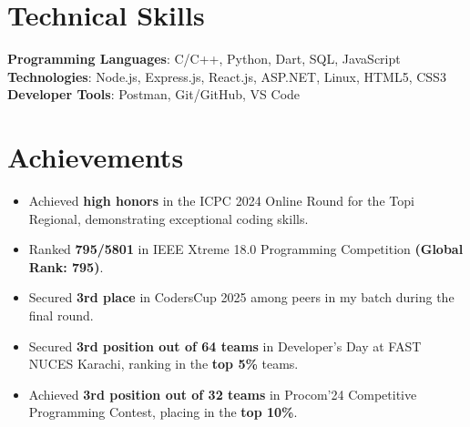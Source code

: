 \documentclass[letterpaper,11pt]{article}
\makeatletter
\newcommand{\resumeItem}[1]{
  \item\small{
    {#1 \vspace{-2pt}}
  }
}
\newcommand{\resumeProjectHeading}[2]{
    \item
    \begin{tabular*}{1.001\textwidth}{l@{\extracolsep{\fill}}r}
      \small#1 & \textbf{\small #2}\\
    \end{tabular*}\vspace{-7pt}
}
\newcommand{\sectionspace}{\vspace{-10pt}}
\newcommand{\resumeSubHeadingListStart}{\begin{itemize}[leftmargin=0.0in, label={}]}
\newcommand{\resumeSubHeadingListEnd}{\end{itemize}}
\newcommand{\resumeItemListStart}{\begin{itemize}}
\newcommand{\resumeItemListEnd}{\end{itemize}\vspace{-5pt}}
\makeatother
\begin{document}
\section{Technical Skills}
 \begin{itemize}[leftmargin=0.15in, label={}]
    \small{\item{
     \textbf{Programming Languages}{:  C/C++, Python, Dart, SQL, JavaScript} \\
     \textbf{Technologies}{: Node.js, Express.js, React.js, ASP.NET,  Linux, HTML5, CSS3} \\
     \textbf{Developer Tools}{: Postman, Git/GitHub, VS Code}
    }}
 \end{itemize}
\sectionspace


\section{Achievements}
 \resumeSubHeadingListStart
  \resumeItemListStart
    \resumeItem{Achieved \textbf{high honors} in the ICPC 2024 Online Round for the Topi Regional, demonstrating exceptional coding skills.}
    \resumeItem{Ranked \textbf{795/5801} in IEEE Xtreme 18.0 Programming Competition \textbf{(Global Rank: 795)}.}
    \resumeItem{Secured \textbf{3rd place} in CodersCup 2025 among peers in my batch during the final round.}
    \resumeItem{Secured \textbf{3rd position out of 64 teams} in Developer's Day at FAST NUCES Karachi, ranking in the \textbf{top 5\%} teams.}
    \resumeItem{Achieved \textbf{3rd position out of 32 teams} in Procom'24 Competitive Programming Contest, placing in the \textbf{top 10\%}.}
  \resumeItemListEnd
 \resumeSubHeadingListEnd
\sectionspace


\end{document}
